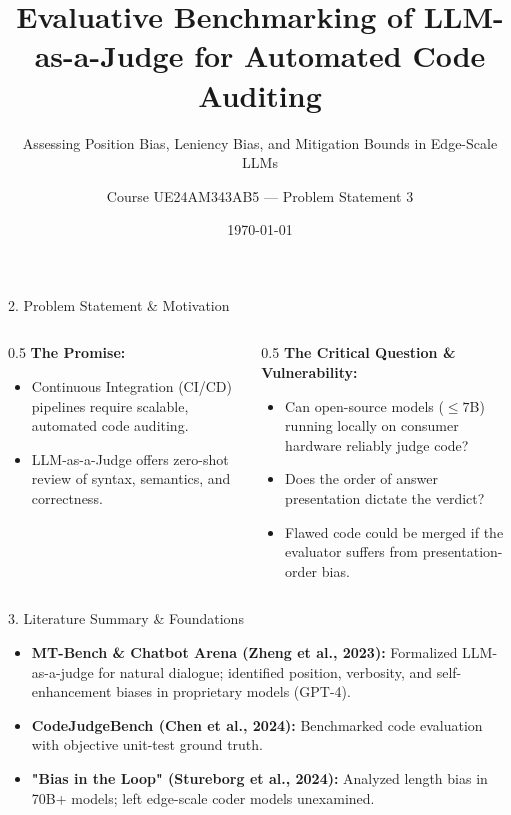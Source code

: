 \documentclass[aspectratio=169]{beamer}
\title[LLM-as-a-Judge Code Auditing]{Evaluative Benchmarking of LLM-as-a-Judge for Automated Code Auditing}
\subtitle{Assessing Position Bias, Leniency Bias, and Mitigation Bounds in Edge-Scale LLMs}
\author[Team PEOGAI]{Course UE24AM343AB5 --- Problem Statement 3}
\institute[PEOGAI]{Department of Computer Science and Engineering}
\date{\today}
\begin{document}
\begin{frame}
  \titlepage
\end{frame}

\begin{frame}{2. Problem Statement \& Motivation}
  \begin{columns}
    \begin{column}{0.5\textwidth}
      \textbf{The Promise:}
      \begin{itemize}
        \item Continuous Integration (CI/CD) pipelines require scalable, automated code auditing.
        \item LLM-as-a-Judge offers zero-shot review of syntax, semantics, and correctness.
      \end{itemize}
    \end{column}
    \begin{column}{0.5\textwidth}
      \textbf{The Critical Question \& Vulnerability:}
      \begin{itemize}
        \item Can open-source models ($\le 7$B) running locally on consumer hardware reliably judge code?
        \item Does the order of answer presentation dictate the verdict?
        \item Flawed code could be merged if the evaluator suffers from presentation-order bias.
      \end{itemize}
    \end{column}
  \end{columns}
\end{frame}

\begin{frame}{3. Literature Summary \& Foundations}
  \begin{itemize}
    \item \textbf{MT-Bench \& Chatbot Arena (Zheng et al., 2023):} Formalized LLM-as-a-judge for natural dialogue; identified position, verbosity, and self-enhancement biases in proprietary models (GPT-4).
    \item \textbf{CodeJudgeBench (Chen et al., 2024):} Benchmarked code evaluation with objective unit-test ground truth.
    \item \textbf{"Bias in the Loop" (Stureborg et al., 2024):} Analyzed length bias in 70B+ models; left edge-scale coder models unexamined.
  \end{itemize}
\end{frame}
\end{document}
